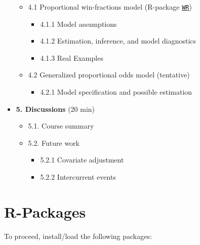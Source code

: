 \documentclass[
  letterpaper,
  DIV=11,
  numbers=noendperiod]{scrreprt}
\providecommand{\tightlist}{%
  \setlength{\itemsep}{0pt}\setlength{\parskip}{0pt}}\usepackage{longtable,booktabs,array}
\begin{document}
\begin{itemize}
  \begin{itemize}
  \tightlist
  \item
    4.1 Proportional win-fractions model (R-package
    \href{https://cran.r-project.org/package=WR}{\texttt{WR}})

    \begin{itemize}
    \tightlist
    \item
      4.1.1 Model assumptions
    \item
      4.1.2 Estimation, inference, and model diagnostics
    \item
      4.1.3 Real Examples
    \end{itemize}
  \item
    4.2 Generalized proportional odds model (tentative)

    \begin{itemize}
    \tightlist
    \item
      4.2.1 Model specification and possible estimation
    \end{itemize}
  \end{itemize}
\item
  \textbf{5. Discussions} (20 min)

  \begin{itemize}
  \tightlist
  \item
    5.1. Course summary
  \item
    5.2. Future work

    \begin{itemize}
    \tightlist
    \item
      5.2.1 Covariate adjustment
    \item
      5.2.2 Intercurrent events
    \end{itemize}
  \end{itemize}
\end{itemize}

\hypertarget{r-packages}{%
\section*{R-Packages}\label{r-packages}}


To proceed, install/load the following packages:
\end{document}
